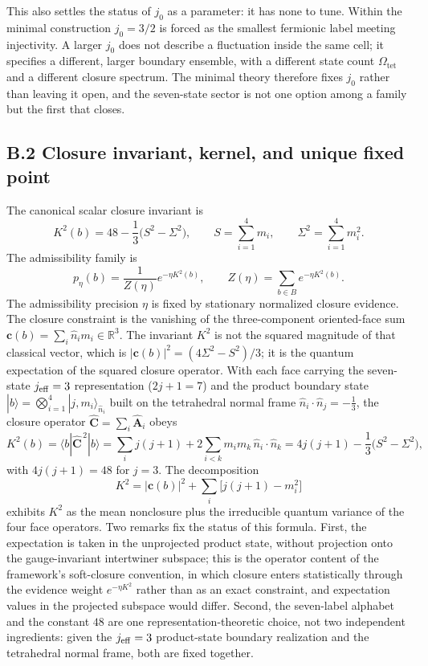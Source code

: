 \documentclass[11pt]{article}
\begin{document}
This also settles the status of $j_0$ as a parameter: it has none to tune. Within the minimal construction $j_0=3/2$ is forced as the smallest fermionic label meeting injectivity. A larger $j_0$ does not describe a fluctuation inside the same cell; it specifies a different, larger boundary ensemble, with a different state count $\Omega_{\mathrm{tet}}$ and a different closure spectrum. The minimal theory therefore fixes $j_0$ rather than leaving it open, and the seven-state sector is not one option among a family but the first that closes.

\subsection*{B.2 Closure invariant, kernel, and unique fixed point}

The canonical scalar closure invariant is
\[
K^2(b)=48-\frac{1}{3}\bigl(S^2-\Sigma^2\bigr),
\qquad
S=\sum_{i=1}^4 m_i,
\qquad
\Sigma^2=\sum_{i=1}^4 m_i^2.
\]
The admissibility family is
\[
p_\eta(b)=\frac{1}{Z(\eta)}e^{-\eta K^2(b)},
\qquad
Z(\eta)=\sum_{b\in B}e^{-\eta K^2(b)}.
\]
The admissibility precision $\eta$ is fixed by stationary normalized closure evidence. The closure constraint is the vanishing of the three-component oriented-face sum $\mathbf c(b)=\sum_i\hat n_i m_i\in\mathbb R^3$. The invariant $K^2$ is not the squared magnitude of that classical vector, which is $|\mathbf c(b)|^2=(4\Sigma^2-S^2)/3$; it is the quantum expectation of the squared closure operator. With each face carrying the seven-state $j_{\rm eff}=3$ representation ($2j+1=7$) and the product boundary state $|b\rangle=\bigotimes_{i=1}^4|j,m_i\rangle_{\hat n_i}$ built on the tetrahedral normal frame $\hat n_i\!\cdot\!\hat n_j=-\tfrac13$, the closure operator $\widehat{\mathbf C}=\sum_i\widehat{\mathbf A}_i$ obeys
\[
K^2(b)=\langle b|\widehat{\mathbf C}^{\,2}|b\rangle
=\sum_i j(j+1)+2\sum_{i<k}m_im_k\,\hat n_i\!\cdot\!\hat n_k
=4j(j+1)-\frac13\bigl(S^2-\Sigma^2\bigr),
\]
with $4j(j+1)=48$ for $j=3$. The decomposition
\[
K^2=|\mathbf c(b)|^2+\sum_i\bigl[j(j+1)-m_i^2\bigr]
\]
exhibits $K^2$ as the mean nonclosure plus the irreducible quantum variance of the four face operators. Two remarks fix the status of this formula. First, the expectation is taken in the unprojected product state, without projection onto the gauge-invariant intertwiner subspace; this is the operator content of the framework's soft-closure convention, in which closure enters statistically through the evidence weight $e^{-\eta K^2}$ rather than as an exact constraint, and expectation values in the projected subspace would differ. Second, the seven-label alphabet and the constant $48$ are one representation-theoretic choice, not two independent ingredients: given the $j_{\rm eff}=3$ product-state boundary realization and the tetrahedral normal frame, both are fixed together.
\end{document}
